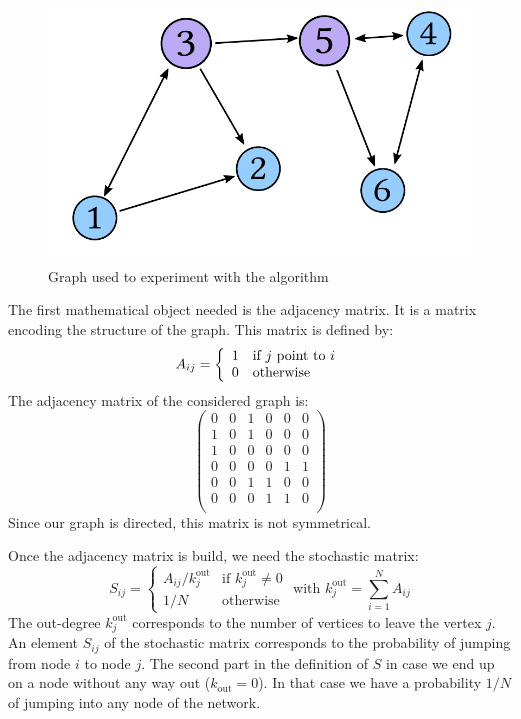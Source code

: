 \begin{figure}[htbp]
    \centering
    \includegraphics[width=.5\linewidth]{network.pdf}
    \caption{Graph used to experiment with the algorithm}\label{fig:network}
\end{figure}

The first mathematical object needed is the adjacency matrix. It is a matrix encoding the structure of the graph. This matrix is defined by:
\begin{equation}
    A_{ij} = \left\{\begin{array}{ll}
        1 & $if $j$ point to $i\\
        0 & \text{otherwise}
    \end{array} \right.
\end{equation}
The adjacency matrix of the considered graph is:
\[
    \begin{pmatrix}
        0 & 0 & 1 & 0 & 0 & 0\\
        1 & 0 & 1 & 0 & 0 & 0\\
        1 & 0 & 0 & 0 & 0 & 0\\
        0 & 0 & 0 & 0 & 1 & 1\\
        0 & 0 & 1 & 1 & 0 & 0\\
        0 & 0 & 0 & 1 & 1 & 0\\
    \end{pmatrix}
\]
Since our graph is directed, this matrix is not symmetrical.

Once the adjacency matrix is build, we need the stochastic matrix:
\begin{equation}
    S_{ij} = \left\{ \begin{array}{ll}
        A_{ij} / k_j^{\text{out}} & \text{if } k_j^{\text{out}} \neq 0\\
        1 / N & \text{otherwise} 
    \end{array} \right. \text{ with } k_j^{\text{out}} = \displaystyle\sum_{i=1}^{N} A_{ij}
\end{equation}
The out-degree $k_j^{\text{out}}$ corresponds to the number of vertices to leave the vertex $j$. An element $S_{ij}$ of the stochastic matrix corresponds to the probability of jumping from node $i$ to node $j$. The second part in the definition of $S$ in case we end up on a node without any way out ($k_{\text{out}} = 0$). In that case we have a probability $1/N$ of jumping into any node of the network.

